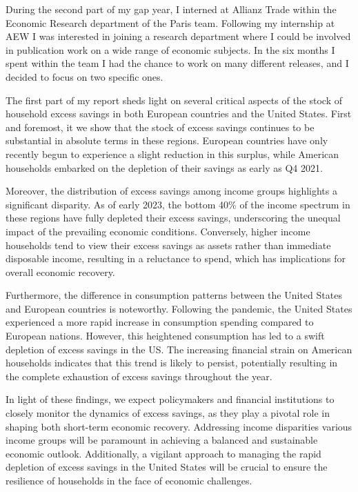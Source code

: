 \quad During the second part of my gap year, I interned at Allianz Trade within the Economic Research department of the Paris team. 
Following my internship at AEW I was interested in joining a research department where I could be involved in publication work on a wide range of economic subjects. 
In the six months I spent within the team I had the chance to work on many different releases, and I decided to focus on two specific ones.

The first part of my report sheds light on several critical aspects of the stock of household excess savings in both European countries and the United States. 
First and foremost, it we show that the stock of excess savings continues to be substantial in absolute terms in these regions. 
European countries have only recently begun to experience a slight reduction in this surplus, while American households embarked on the depletion of their savings as early as Q4 2021.

Moreover, the distribution of excess savings among income groups highlights a significant disparity. 
As of early 2023, the bottom 40\% of the income spectrum in these regions have fully depleted their excess savings, underscoring the unequal impact of the prevailing economic conditions. 
Conversely, higher income households tend to view their excess savings as assets rather than immediate disposable income, resulting in a reluctance to spend, which has implications for overall economic recovery.

Furthermore, the difference in consumption patterns between the United States and European countries is noteworthy. 
Following the pandemic, the United States experienced a more rapid increase in consumption spending compared to European nations. 
However, this heightened consumption has led to a swift depletion of excess savings in the US. 
The increasing financial strain on American households indicates that this trend is likely to persist, potentially resulting in the complete exhaustion of excess savings throughout the year.

In light of these findings, we expect policymakers and financial institutions to closely monitor the dynamics of excess savings, as they play a pivotal role in shaping both short-term economic recovery. 
Addressing income disparities various income groups will be paramount in achieving a balanced and sustainable economic outlook. 
Additionally, a vigilant approach to managing the rapid depletion of excess savings in the United States will be crucial to ensure the resilience of households in the face of economic challenges.

